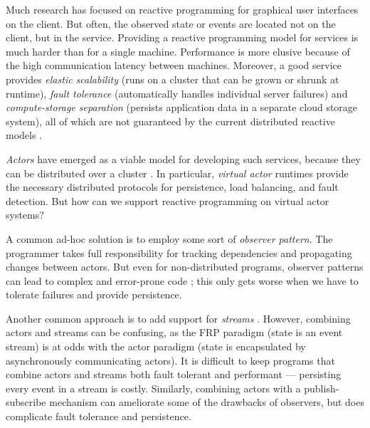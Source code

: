  Much research has focused on reactive programming for graphical user interfaces \cite{elm,flapjax,alive} on the client. But often, the observed state or events are located not on the client, but in the service. Providing a reactive programming model for services is much harder than for a single machine. Performance is more elusive because of the high communication latency between machines. Moreover, a good service provides \emph{elastic scalability} (runs on a cluster that can be grown or shrunk at runtime),  \emph{fault tolerance} (automatically handles individual server failures) and \emph{compute-storage separation} (persists application data in a separate cloud storage system), 
all of which are not guaranteed by the current distributed reactive models \cite{drescala}.

\emph{Actors} have emerged as a viable model for developing such services, because they can be distributed over a cluster \cite{erlang,akka,orleans}. In particular, \emph{virtual actor} runtimes \cite{orleanstr,orleans,sfactors,orbit} provide the necessary distributed protocols for persistence, load balancing, and fault detection. But how can we support reactive programming on virtual actor systems?
 
A common ad-hoc solution is to employ some sort of \emph{observer pattern}. The programmer takes full responsibility for tracking dependencies and propagating changes between actors. But even for non-distributed programs, observer patterns can lead to complex and error-prone code \cite{sobserver}; this only gets worse when we have to tolerate failures and provide persistence. 

Another common approach is to add support for \emph{streams} \cite{orleans,reactors-io}. However, combining actors and streams can be confusing, as the FRP paradigm (state is an event stream) is at odds with the actor paradigm (state is encapsulated by asynchronously communicating actors). It is difficult to keep programs that combine actors and streams both fault tolerant and performant --- persisting every event in a stream is costly. Similarly, combining actors with a publish-subscribe mechanism \cite{patrick} can ameliorate some of the drawbacks of observers, but does complicate fault tolerance and persistence.

